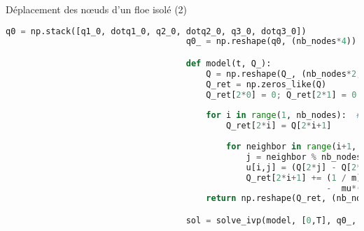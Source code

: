 \begin{frame}[fragile]{Déplacement des n\oe{}uds d'un floe isolé (2)}

    \tiny
    \begin{lstlisting}[language=Python,caption=Code de simulation et schéma avec Scipy]
                                    q0 = np.stack([q1_0, dotq1_0, q2_0, dotq2_0, q3_0, dotq3_0])
                                    q0_ = np.reshape(q0, (nb_nodes*4))

                                    def model(t, Q_):
                                        Q = np.reshape(Q_, (nb_nodes*2, 2))
                                        Q_ret = np.zeros_like(Q)
                                        Q_ret[2*0] = 0; Q_ret[2*1] = 0
                                        
                                        for i in range(1, nb_nodes):  ## <-- Node 0 is immobilized
                                            Q_ret[2*i] = Q[2*i+1] 
                                            
                                            for neighbor in range(i+1, i+3):
                                                j = neighbor % nb_nodes
                                                u[i,j] = (Q[2*j] - Q[2*i]) / nplin.norm(Q[2*j] - Q[2*i])
                                                Q_ret[2*i+1] += (1 / m)*C[i,j]*( k*(nplin.norm(Q[2*j]-Q[2*i]) - L[i,j])*u[i,j]
                                                                -  mu*(np.dot(Q[2*j+1] - Q[2*i+1], u[i,j]))*u[i,j] )
                                        return np.reshape(Q_ret, (nb_nodes*4))

                                    sol = solve_ivp(model, [0,T], q0_, t_eval=t)
    \end{lstlisting}
    
	\hspace*{-1cm}
	

\end{frame}




